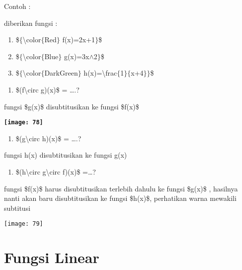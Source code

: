 \documentclass[11pt,fleqn]{book} %
\begin{document}
\noindent Contoh :

\noindent diberikan fungsi :

\begin{enumerate}
\item  \$$\{${\textbackslash}color$\{$Red$\}$ f(x)=2x+1$\}$\$

\item  \$$\{${\textbackslash}color$\{$Blue$\}$ g(x)=3x$\wedge$2$\}$\$

\item  \$$\{${\textbackslash}color$\{$DarkGreen$\}$ h(x)={\textbackslash}frac$\{$1$\}$$\{$x+4$\}$$\}$\$
\end{enumerate}

\noindent 

\begin{enumerate}
\item  \$(f{\textbackslash}circ g)(x)\$ = {\dots}.?
\end{enumerate}

\noindent fungsi \$g(x)\$ disubtitusikan ke fungsi \$f(x)\$

\begin{center}
\noindent \textbf{\texttt{[image: 78]}}
\end{center}

\begin{enumerate}
\item \textbf{ }\$(g{\textbackslash}circ h)(x)\$ = {\dots}.?
\end{enumerate}

\noindent fungsi h(x) disubtitusikan ke fungsi g(x)

\begin{enumerate}
\item  \$(h{\textbackslash}circ g{\textbackslash}circ f)(x)\$ ={\dots}?
\end{enumerate}

\noindent fungsi \$f(x)\$ harus disubtitusikan terlebih dahulu ke fungsi \$g(x)\$ , hasilnya nanti akan  baru disubtitusikan ke fungsi \$h(x)\$, perhatikan warna mewakili subtitusi

\begin{center}
\noindent \texttt{[image: 79]}
\end{center}

\noindent \textbf{}

\noindent

\section{Fungsi Linear}
\end{document}
